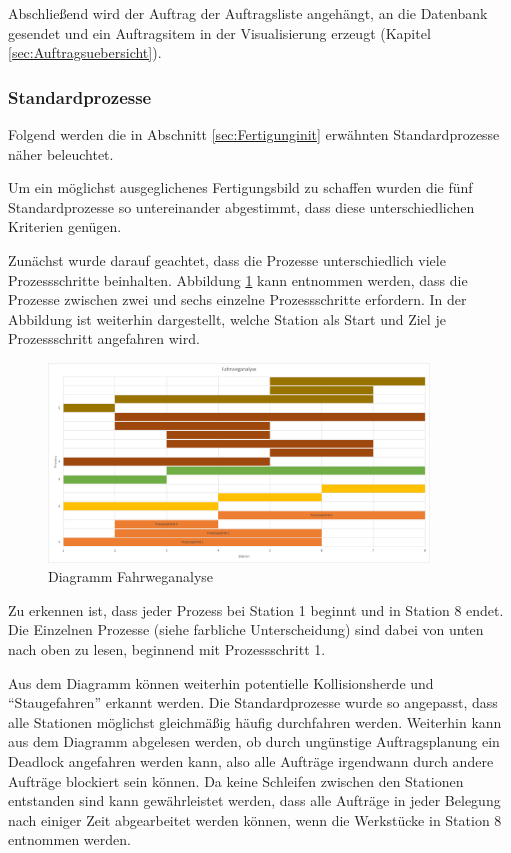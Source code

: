 Abschließend wird der Auftrag der Auftragsliste angehängt, an die Datenbank gesendet und ein Auftragsitem in der Visualisierung erzeugt (Kapitel \ref{sec:Auftragsuebersicht}). 

\subsubsection{Standardprozesse}
\label{sec:Standardprozesse}

Folgend werden die in Abschnitt \ref{sec:Fertigunginit} erwähnten Standardprozesse näher beleuchtet. 

Um ein möglichst ausgeglichenes Fertigungsbild zu schaffen wurden die fünf Standardprozesse so untereinander abgestimmt, dass diese unterschiedlichen Kriterien genügen. 

Zunächst wurde darauf geachtet, dass die Prozesse unterschiedlich viele Prozessschritte beinhalten. Abbildung \ref{fig:Fahrweganalyse} kann entnommen werden, dass die Prozesse zwischen zwei und sechs einzelne Prozessschritte erfordern. In der Abbildung ist weiterhin dargestellt, welche Station als Start und Ziel je Prozessschritt angefahren wird. 

\begin{figure}[htb]
    \centering
    \includegraphics[width=0.9\textwidth]{Abbildungen/Fahrweganalyse.PNG}
    \caption{Diagramm Fahrweganalyse}		
    \label{fig:Fahrweganalyse}
\end{figure}

Zu erkennen ist, dass jeder Prozess bei Station 1 beginnt und in Station 8 endet. Die Einzelnen Prozesse (siehe farbliche Unterscheidung) sind dabei von unten nach oben zu lesen, beginnend mit Prozessschritt 1. 

Aus dem Diagramm können weiterhin potentielle Kollisionsherde und "`Staugefahren"' erkannt werden. Die Standardprozesse wurde so angepasst, dass alle Stationen möglichst gleichmäßig häufig durchfahren werden. Weiterhin kann aus dem Diagramm abgelesen werden, ob durch ungünstige Auftragsplanung ein Deadlock angefahren werden kann, also alle Aufträge irgendwann durch andere Aufträge blockiert sein können. Da keine Schleifen zwischen den Stationen entstanden sind kann gewährleistet werden, dass alle Aufträge in jeder Belegung nach einiger Zeit abgearbeitet werden können, wenn die Werkstücke in Station 8 entnommen werden.

